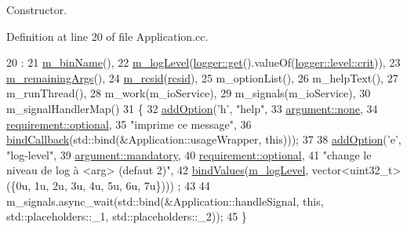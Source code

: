 Constructor. 



Definition at line 20 of file Application.\-cc.


\begin{DoxyCode}
20                              :
21   \hyperlink{classxtd_1_1Application_abdf4c6f863c5a7a4ee842906f546c458}{m\_binName}(),
22   \hyperlink{classxtd_1_1Application_a3f815061d81aa12974b2b6ee48b9f5e9}{m\_logLevel}(\hyperlink{classxtd_1_1logger_a21511dfdad9ec1e88c3444637a000e9d}{logger::get}().valueOf(\hyperlink{classxtd_1_1logger_a250ce2f143da181d7149a1556da2a6f1a5888c6a8bb862595985926d16c7dcf13}{logger::level::crit})),
23   \hyperlink{classxtd_1_1Application_a7651fd3849530cdded556187a6b42c25}{m\_remainingArgs}(),
24   \hyperlink{classxtd_1_1Application_ad820953bc15b729ce010f422595d3a3f}{m\_rcsid}(\hyperlink{Application_8cc_a69f59503b72db9ae6ac36f5f5deaeb80}{rcsid}),
25   m\_optionList(),
26   m\_helpText(),
27   m\_runThread(),
28   m\_work(m\_ioService),
29   m\_signals(m\_ioService),
30   m\_signalHandlerMap()
31 \{
32   \hyperlink{classxtd_1_1Application_a7cea42a03984ceed3bae129ff9e1ef54}{addOption}(\textcolor{charliteral}{'h'}, \textcolor{stringliteral}{"help"},
33             \hyperlink{classxtd_1_1Application_a672c075ed901e463609077d571a714c7a334c4a4c42fdb79d7ebc3e73b517e6f8}{argument::none},
34             \hyperlink{classxtd_1_1Application_a49c0397e9fd22067e3a536443a17fe24ad57c24f3fe52d16e7169b912dd647f0d}{requirement::optional},
35             \textcolor{stringliteral}{"imprime ce message"},
36             \hyperlink{classxtd_1_1Application_a00f6aed6c376028a79492b04e8325968}{bindCallback}(std::bind(&Application::usageWrapper, \textcolor{keyword}{this})));
37 
38   \hyperlink{classxtd_1_1Application_a7cea42a03984ceed3bae129ff9e1ef54}{addOption}(\textcolor{charliteral}{'e'}, \textcolor{stringliteral}{"log-level"},
39             \hyperlink{classxtd_1_1Application_a672c075ed901e463609077d571a714c7ac5e3b9675d114c21ad3367d318f6aa95}{argument::mandatory},
40             \hyperlink{classxtd_1_1Application_a49c0397e9fd22067e3a536443a17fe24ad57c24f3fe52d16e7169b912dd647f0d}{requirement::optional},
41             \textcolor{stringliteral}{"change le niveau de log à <arg> (defaut 2)"},
42             \hyperlink{classxtd_1_1Application_aaa0388f1c96893a26cfe5522b0804dd9}{bindValues}(\hyperlink{classxtd_1_1Application_a3f815061d81aa12974b2b6ee48b9f5e9}{m\_logLevel}, vector<uint32\_t>(\{0u, 1u, 2u, 3u, 4u, 5u, 6u, 7u\})))
      ;
43 
44   m\_signals.async\_wait(std::bind(&Application::handleSignal, \textcolor{keyword}{this}, std::placeholders::\_1, 
      std::placeholders::\_2));
45 \}
\end{DoxyCode}



